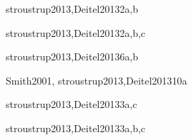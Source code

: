 \begin{syllabus}
\begin{unit}{\PLVirtualMachinesDef}{stroustrup2013,Deitel2013}{2}{a,b}
   \begin{unitgoals}
      \item \PLVirtualMachinesObjONE
      \item \PLVirtualMachinesObjTWO
      \item \PLVirtualMachinesObjTHREE
   \end{unitgoals}
\end{unit}

\begin{unit}{\PLDeclarationsAndTypesDef}{stroustrup2013,Deitel2013}{2}{a,b,c}
   \begin{topics}
      \item \PLDeclarationsAndTypesTopicThe%
      \item \PLDeclarationsAndTypesTopicDeclaration%
      \item \PLDeclarationsAndTypesTopicOverview%
   \end{topics}

   \begin{unitgoals}
	\item \PLDeclarationsAndTypesObjONE
	\item \PLDeclarationsAndTypesObjTWO
	\item \PLDeclarationsAndTypesObjTHREE
	\item \PLDeclarationsAndTypesObjFOUR
	\item \PLDeclarationsAndTypesObjFIVE
   \end{unitgoals}
\end{unit}

\begin{unit}{\PFFundamentalConstructsDef}{stroustrup2013,Deitel2013}{6}{a,b}
    \PFFundamentalConstructsAllTopics
    \PFFundamentalConstructsAllObjectives
\end{unit}

\begin{unit}{\PLObjectOrientedProgrammingDef}{Smith2001, stroustrup2013,Deitel2013}{10}{a}
   \PLObjectOrientedProgrammingAllTopics
   \PLObjectOrientedProgrammingAllObjectives
\end{unit}

\begin{unit}{\PFAlgorithmsAndProblemSolvingDef}{stroustrup2013,Deitel2013}{3}{a,c}
    \PFAlgorithmsAndProblemSolvingAllTopics
    \PFAlgorithmsAndProblemSolvingAllObjectives
\end{unit}

\begin{unit}{\PFRecursionDef}{stroustrup2013,Deitel2013}{3}{a,b,c}
    \PFRecursionAllTopics
    \PFRecursionAllObjectives
\end{unit}


\end{syllabus}
